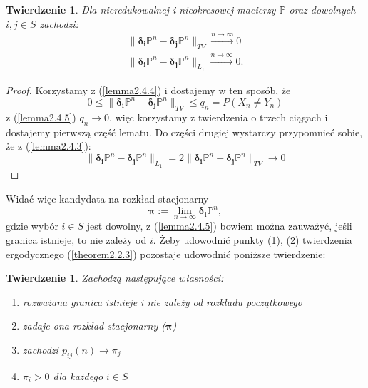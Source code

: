 \documentclass[a4paper]{article}
\theoremstyle{defn}
\theoremstyle{theorem}
\newtheorem{theorem}[defn]{Twierdzenie}
\theoremstyle{lemma}
\theoremstyle{cor}
\theoremstyle{fact}
\begin{document}
\begin{theorem}\label{theorem2.4.6}
Dla nieredukowalnej i nieokresowej macierzy $\mathbb{P}$ oraz dowolnych $i, j \in S$ zachodzi:
\begin{align*}
\|\boldsymbol{\delta_i}\mathbb{P}^n - \boldsymbol{\delta_j}\mathbb{P}^n\|_{TV} \xrightarrow{n \to \infty} 0 \\
\|\boldsymbol{\delta_i}\mathbb{P}^n - \boldsymbol{\delta_j}\mathbb{P}^n\|_{L_1} \xrightarrow{n \to \infty} 0.
\end{align*}
\end{theorem}
\begin{proof}
Korzystamy z (\ref{lemma2.4.4}) i dostajemy w ten sposób, że $$0 \leq \|\boldsymbol{\delta_i}\mathbb{P}^n - \boldsymbol{\delta_j}\mathbb{P}^n\|_{TV} \leq q_n = P(X_n \neq Y_n)$$
z (\ref{lemma2.4.5}) $q_n \to 0$, więc korzystamy z twierdzenia o trzech ciągach i dostajemy pierwszą część lematu. Do części drugiej wystarczy przypomnieć sobie, że z (\ref{lemma2.4.3}):  $$\|\boldsymbol{\delta_i}\mathbb{P}^n - \boldsymbol{\delta_j}\mathbb{P}^n\|_{L_1} = 2\|\boldsymbol{\delta_i}\mathbb{P}^n - \boldsymbol{\delta_j}\mathbb{P}^n\|_{TV} \to 0$$
\end{proof}
Widać więc kandydata na rozkład stacjonarny $$\boldsymbol{\pi} := \lim\limits_{n \to \infty} \boldsymbol{\delta_i}\mathbb{P}^n,$$ gdzie wybór $i \in S$ jest dowolny, z (\ref{lemma2.4.5}) bowiem można zauważyć, jeśli granica istnieje, to nie zależy od $i$. Żeby udowodnić punkty (1), (2) twierdzenia ergodycznego (\ref{theorem2.2.3}) pozostaje udowodnić poniższe twierdzenie:
\begin{theorem}\label{theorem2.4.7}
Zachodzą następujące własności:
\begin{enumerate}
	\item[(a)] rozważana granica istnieje i nie zależy od rozkładu początkowego
	\item[(b)] zadaje ona rozkład stacjonarny ($\boldsymbol{\pi}$)
	\item[(c)] zachodzi $p_{ij}(n) \to \pi_j$
	\item[(d)] $\pi_i > 0$ dla każdego $i \in S$
\end{enumerate}
\end{theorem}
\end{document}
